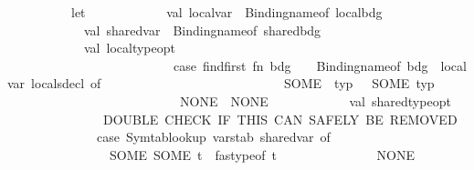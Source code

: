 \begin{isabellebody}
\ \ \ \ \ \ \ \ \ \ let\isanewline
\ \ \ \ \ \ \ \ \ \ \ \ val\ local{\isacharunderscore}{\kern0pt}var\ {\isacharequal}{\kern0pt}\ Binding{\isachardot}{\kern0pt}name{\isacharunderscore}{\kern0pt}of\ local{\isacharunderscore}{\kern0pt}bdg\isanewline
\ \ \ \ \ \ \ \ \ \ \ \ val\ shared{\isacharunderscore}{\kern0pt}var\ {\isacharequal}{\kern0pt}\ Binding{\isachardot}{\kern0pt}name{\isacharunderscore}{\kern0pt}of\ shared{\isacharunderscore}{\kern0pt}bdg\isanewline
\ \ \ \ \ \ \ \ \ \ \ \ val\ local{\isacharunderscore}{\kern0pt}type{\isacharunderscore}{\kern0pt}opt\ {\isacharequal}{\kern0pt}\isanewline
\ \ \ \ \ \ \ \ \ \ \ \ \ \ \ \ \ \ \ \ \ \ \ \ \ \ case\ find{\isacharunderscore}{\kern0pt}first\ {\isacharparenleft}{\kern0pt}fn\ {\isacharparenleft}{\kern0pt}{\isacharparenleft}{\kern0pt}bdg{\isacharprime}{\kern0pt}{\isacharcomma}{\kern0pt}\ {\isacharunderscore}{\kern0pt}{\isacharparenright}{\kern0pt}{\isacharcomma}{\kern0pt}\ {\isacharunderscore}{\kern0pt}{\isacharparenright}{\kern0pt}\ {\isacharequal}{\kern0pt}{\isachargreater}{\kern0pt}\ Binding{\isachardot}{\kern0pt}name{\isacharunderscore}{\kern0pt}of\ bdg{\isacharprime}{\kern0pt}\ {\isacharequal}{\kern0pt}\ local{\isacharunderscore}{\kern0pt}var{\isacharparenright}{\kern0pt}\ locals{\isacharunderscore}{\kern0pt}decl\ of\isanewline
\ \ \ \ \ \ \ \ \ \ \ \ \ \ \ \ \ \ \ \ \ \ \ \ \ \ \ \ SOME\ {\isacharparenleft}{\kern0pt}{\isacharparenleft}{\kern0pt}{\isacharunderscore}{\kern0pt}{\isacharcomma}{\kern0pt}\ typ{\isacharparenright}{\kern0pt}{\isacharcomma}{\kern0pt}\ {\isacharunderscore}{\kern0pt}{\isacharparenright}{\kern0pt}\ {\isacharequal}{\kern0pt}{\isachargreater}{\kern0pt}\ SOME\ typ\isanewline
\ \ \ \ \ \ \ \ \ \ \ \ \ \ \ \ \ \ \ \ \ \ \ \ \ \ {\isacharbar}{\kern0pt}\ NONE\ {\isacharequal}{\kern0pt}{\isachargreater}{\kern0pt}\ NONE\isanewline
\isanewline
\ \ \ \ \ \ \ \ \ \ \ \ val\ shared{\isacharunderscore}{\kern0pt}type{\isacharunderscore}{\kern0pt}opt\ {\isacharequal}{\kern0pt}\isanewline
\ \ \ \ \ \ \ \ \ \ \ \ \ \ {\isacharparenleft}{\kern0pt}{\isacharasterisk}{\kern0pt}\ DOUBLE\ CHECK\ IF\ THIS\ CAN\ SAFELY\ BE\ REMOVED\isanewline
\isanewline
\ \ \ \ \ \ \ \ \ \ \ \ \ \ case\ Symtab{\isachardot}{\kern0pt}lookup\ varstab\ shared{\isacharunderscore}{\kern0pt}var\ of\isanewline
\ \ \ \ \ \ \ \ \ \ \ \ \ \ \ \ SOME\ {\isacharparenleft}{\kern0pt}SOME\ t{\isacharparenright}{\kern0pt}\ {\isacharequal}{\kern0pt}{\isachargreater}{\kern0pt}\ fastype{\isacharunderscore}{\kern0pt}of\ t\isanewline
\ \ \ \ \ \ \ \ \ \ \ \ \ \ {\isacharbar}{\kern0pt}\ NONE\ {\isacharequal}{\kern0pt}{\isachargreater}{\kern0pt}\isanewline

\end{isabellebody}
